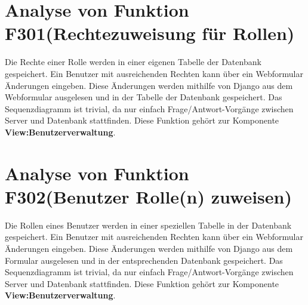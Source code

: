 \section{Analyse von Funktion F301(Rechtezuweisung für Rollen)}
Die Rechte einer Rolle werden in einer eigenen Tabelle der Datenbank gespeichert. Ein Benutzer mit ausreichenden Rechten kann über ein Webformular Änderungen eingeben. Diese Änderungen werden mithilfe von Django aus dem Webformular ausgelesen und in der Tabelle der Datenbank gespeichert. Das Sequenzdiagramm ist trivial, da nur einfach Frage/Antwort-Vorgänge zwischen Server und Datenbank stattfinden. Diese Funktion gehört zur Komponente \textbf{View:Benutzerverwaltung}.

\section{Analyse von Funktion F302(Benutzer Rolle(n) zuweisen)}
Die Rollen eines Benutzer werden in einer speziellen Tabelle in der Datenbank gespeichert. Ein Benutzer mit ausreichenden Rechten kann über ein Webformular Änderungen eingeben. Diese Änderungen werden mithilfe von Django aus dem Formular ausgelesen und in der entsprechenden Datenbank gespeichert. Das Sequenzdiagramm ist trivial, da nur einfach Frage/Antwort-Vorgänge zwischen Server und Datenbank stattfinden. Diese Funktion gehört zur Komponente \textbf{View:Benutzerverwaltung}.
